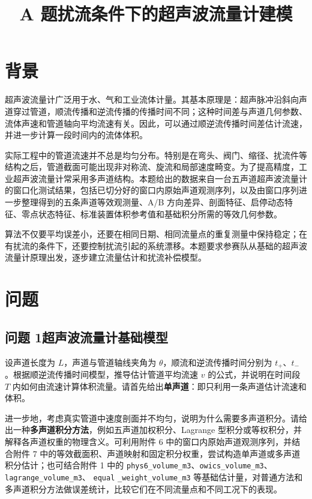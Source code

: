 \documentclass[UTF8,a4paper,11pt]{ctexart}
\title{A 题\quad 扰流条件下的超声波流量计建模}
\author{}
\date{}
\begin{document}
\maketitle

\section*{背景}

超声波流量计广泛用于水、气和工业流体计量。其基本原理是：超声脉冲沿斜向声道穿过管道，顺流传播和逆流传播的传播时间不同；这种时间差与声道几何参数、流体声速和管道轴向平均流速有关。因此，可以通过顺逆流传播时间差估计流速，并进一步计算一段时间内的流体体积。

实际工程中的管道流速并不总是均匀分布。特别是在弯头、阀门、缩径、扰流件等结构之后，管道截面可能出现非对称流、旋流和局部速度畸变。为了提高精度，工业超声波流量计常采用多声道结构。本题给出的数据来自一台五声道超声波流量计的窗口化测试结果，包括已切分好的窗口内原始声道观测序列，以及由窗口序列进一步整理得到的五条声道等效观测量、A/B 方向差异、剖面特征、启停动态特征、零点状态特征、标准装置体积参考值和基础积分所需的等效几何参数。

算法不仅要平均误差小，还要在相同日期、相同流量点的重复测量中保持稳定；在有扰流的条件下，还要控制扰流引起的系统漂移。本题要求参赛队从基础的超声波流量计原理出发，逐步建立流量估计和扰流补偿模型。

\section*{问题}

\subsection*{问题 1\quad 超声波流量计基础模型}

设声道长度为 $L$，声道与管道轴线夹角为 $\theta$，顺流和逆流传播时间分别为 $t_+$、$t_-$。根据顺逆流传播时间模型，推导估计管道平均流速 $v$ 的公式，并说明在时间段 $T$ 内如何由流速计算体积流量。请首先给出\textbf{单声道}：即只利用一条声道估计流速和体积。

进一步地，考虑真实管道中速度剖面并不均匀，说明为什么需要多声道积分。请给出一种\textbf{多声道积分方法}，例如五声道加权积分、Lagrange 型积分或等权积分，并解释各声道权重的物理含义。可利用附件 6 中的窗口内原始声道观测序列，并结合附件 7 中的等效截面积、声道映射和固定积分权重，尝试构造单声道或多声道积分估计；也可结合附件 1 中的 \texttt{phys6\_volume\_m3}、\texttt{owics\_volume\_m3}、\texttt{lagrange\_volume\_m3}、
\texttt{equal} \texttt{\_weight\_volume\_m3} 等基础估计量，对普通方法和多声道积分方法做误差统计，比较它们在不同流量点和不同工况下的表现。
\end{document}
